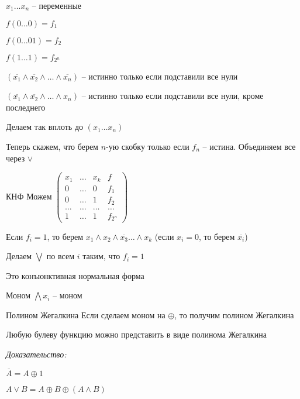 \documentclass[12pt]{article}
\begin{document}
$x_1 \ldots x_n$ -- переменные

$f(0 \ldots 0) = f_1$

$f(0 \ldots 0 1) = f_2$

$f(1 \ldots 1) = f_{2^n}$

$(\overline{x_1} \land \overline{x_2} \land \ldots \land \overline{x_n})$ -- истинно только если подставили все нули

$(\overline{x_1} \land \overline{x_2} \land \ldots \land x_n)$ -- истинно только если подставили все нули, кроме последнего

Делаем так вплоть до $(x_1 \ldots x_n)$

Теперь скажем, что берем $n$-ую скобку только если $f_n$ -- истина. Объединяем все через $\lor$

\begin{defin}{КНФ}
    Можем $\begin{pmatrix}
        x_1 & \ldots & x_k & f \\
        0 & \ldots & 0 & f_1 \\
        0 & \ldots & 1 & f_2 \\
        \ldots & \ldots & \ldots & \ldots \\
        1 & \ldots & 1 & f_{2^n}
    \end{pmatrix}$
    
    Если $f_i = 1$, то берем $x_1 \land x_2 \land \overline{x_3} \ldots \land x_k$ (если $x_i = 0$, то берем $\overline{x_i}$)
    
    Делаем $\bigvee$ по всем $i$ таким, что $f_i = 1$
    
    Это конъюнктивная нормальная форма
\end{defin}

\begin{defin}{Моном}
    $\bigwedge x_i$ -- моном
\end{defin}

\begin{defin}{Полином Жегалкина}
    Если сделаем моном на $\oplus$, то получим полином Жегалкина
\end{defin}

\begin{theo}{}
    Любую булеву функцию можно представить в виде полинома Жегалкина
\end{theo}

\textit{Доказательство:}

$\overline{A} = A \oplus 1$

$A \lor B = A \oplus B \oplus (A \land B)$
\end{document}
